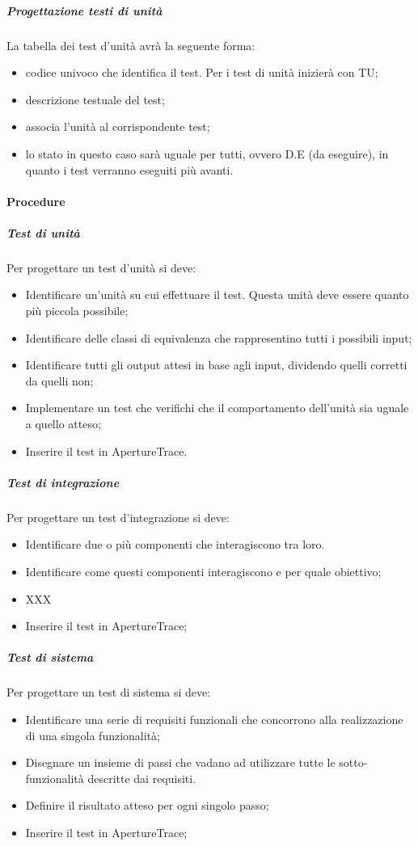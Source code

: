 \subparagraph{Progettazione testi di unità}
La tabella dei test d'unità avrà la seguente forma:
\begin{itemize}
\item {}codice univoco che identifica il test. Per i test di unità inizierà con TU;
\item {} descrizione testuale del test;
\item {} associa l'unità al corrispondente test;
\item {}lo stato in questo caso sarà uguale per tutti, ovvero D.E (da eseguire), in quanto i test verranno eseguiti più avanti.
\end{itemize}

\paragraph{Procedure}

\subparagraph{Test di unità}
Per progettare un test d'unità si deve:
\begin{itemize}
\item Identificare un'unità su cui effettuare il test. Questa unità deve essere quanto più piccola possibile;
\item Identificare delle classi di equivalenza che rappresentino tutti i possibili input;
\item Identificare tutti gli output attesi in base agli input, dividendo quelli corretti da quelli non;
\item Implementare un test che verifichi che il comportamento dell'unità sia uguale a quello atteso;
\item Inserire il test in ApertureTrace.
\end{itemize}

\subparagraph{Test di integrazione}
Per progettare un test d'integrazione si deve:
\begin{itemize}
\item Identificare due o più componenti che interagiscono tra loro.
\item Identificare come questi componenti interagiscono e per quale obiettivo;
\item XXX
\item Inserire il test in ApertureTrace;
\end{itemize}

\subparagraph{Test di sistema}
Per progettare un test di sistema si deve:
\begin{itemize}
\item Identificare una serie di requisiti funzionali che concorrono alla realizzazione di una singola funzionalità;
\item Disegnare un insieme di passi che vadano ad utilizzare tutte le sotto-funzionalità descritte dai requisiti.
\item Definire il risultato atteso per ogni singolo passo;
\item Inserire il test in ApertureTrace;
\end{itemize}

